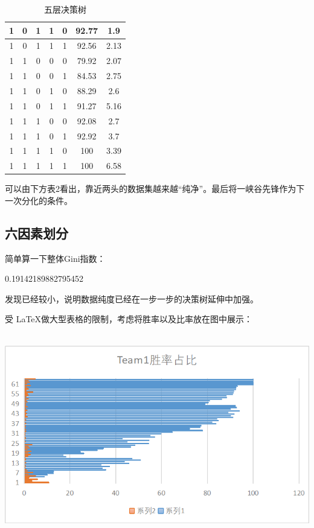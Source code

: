 \documentclass[lang=cn,11pt]{elegantpaper}
\begin{document}
\begin{table}[htbp]
\begin{center}
\begin{tabular}{ccccccc}
\hline
 1 & 0 & 1 & 1 & 0 & 92.77	& 1.9 \\
\hline
 1 & 0 & 1 & 1 & 1 & 92.56	& 2.13 \\
\hline
 1 & 1 & 0 & 0 & 0 & 79.92	& 2.07 \\
\hline
 1 & 1 & 0 & 0 & 1 & 84.53	& 2.75 \\
\hline
 1 & 1 & 0 & 1 & 0 & 88.29	& 2.6 \\
\hline
 1 & 1 & 0 & 1 & 1 & 91.27	& 5.16 \\
\hline
 1 & 1 & 1 & 0 & 0 & 92.08	& 2.7 \\
\hline
 1 & 1 & 1 & 0 & 1 & 92.92	& 3.7\\
\hline
 1 & 1 & 1 & 1 & 0 & 100	& 3.39 \\
\hline
 1 & 1 & 1 & 1 & 1 & 100	& 6.58 \\
\bottomrule
\end{tabular}
\caption{五层决策树 \label{tab:reg}}
\end{center}
\end{table}

可以由下方表2看出，靠近两头的数据集越来越“纯净”。最后将一峡谷先锋作为下一次分化的条件。
\subsection{六因素划分}
简单算一下整体Gini指数：

0.19142189882795452

发现已经较小，说明数据纯度已经在一步一步的决策树延伸中加强。

受 \LaTeX{}做大型表格的限制，考虑将胜率以及比率放在图中展示：
\\~
\begin{center}
\includegraphics{图片1.png}\\
\end{center}
\end{document}
